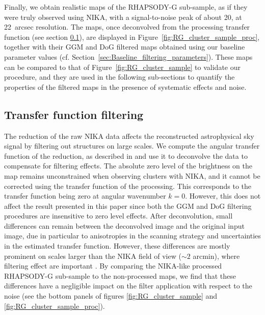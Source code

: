 \documentclass[twocolumn,traditabstract]{aa}
\begin{document}
Finally, we obtain realistic maps of the RHAPSODY-G sub-sample, as if they were truly observed using NIKA, with a signal-to-noise peak of about 20, at 22~arcsec resolution. The maps, once deconvolved from the processing transfer function (see section \ref{sec:Transfer_function_filtering}), are displayed in Figure~\ref{fig:RG_cluster_sample_proc}, together with their GGM and DoG filtered maps obtained using our baseline parameter values (cf. Section~\ref{sec:Baseline_filtering_parameters}). These maps can be compared to that of Figure~\ref{fig:RG_cluster_sample} to validate our procedure, and they are used in the following sub-sections to quantify the properties of the filtered maps in the presence of systematic effects and noise.

\subsection{Transfer function filtering}\label{sec:Transfer_function_filtering}
The reduction of the raw NIKA data affects the reconstructed astrophysical sky signal by filtering out structures on large scales. We compute the angular transfer function of the reduction, as described in \cite{Adam2015} and use it to deconvolve the data to compensate for filtering effects. The absolute zero level of the brightness on the map remains unconstrained when observing clusters with NIKA, and it cannot be corrected using the transfer function of the processing. This corresponds to the transfer function being zero at angular wavenumber $k = 0$. However, this does not affect the result presented in this paper since both the GGM and DoG filtering procedures are insensitive to zero level effects. After deconvolution, small differences can remain between the deconvolved image and the original input image, due in particular to anisotropies in the scanning strategy and uncertainties in the estimated transfer function. However, these differences are mostly prominent on scales larger than the NIKA field of view ($\sim 2$ arcmin), where filtering effect are important \citep{Adam2015}. By comparing the NIKA-like processed RHAPSODY-G sub-sample to the non-processed maps, we find that these differences have a negligible impact on the filter application with respect to the noise (see the bottom panels of figures \ref{fig:RG_cluster_sample} and \ref{fig:RG_cluster_sample_proc}).

\end{document}
